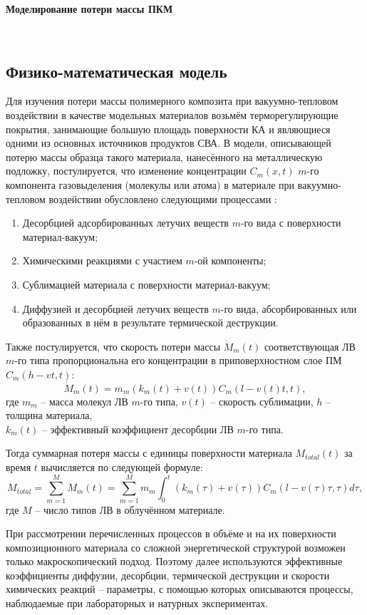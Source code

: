 \documentclass[
11pt,
master, %
subf, %
href, %
colorlinks=true, %
]{disser}
\newcommand*{\SR}[1]{\left( #1 \right)}
\begin{document}
\newpage
\begin{center}
	\textbf{\Large Моделирование потери массы ПКМ}
\end{center}


~

\subsection{Физико-математическая модель}
Для изучения потери массы полимерного композита при вакуумно-тепловом воздействии в качестве модельных материалов возьмём терморегулирующие покрытия, занимающие большую площадь поверхности КА и являющиеся одними из основных источников продуктов СВА. В модели, описывающей потерю массы образца такого материала, нанесённого на металлическую подложку, постулируется, что изменение концентрации $C_m(x,t)$ $m$-го компонента газовыделения (молекулы или атома) в материале при вакуумно-тепловом воздействии обусловлено следующими процессами \cite{Khas06, Khas06i}:
\begin{enumerate}
	\item Десорбцией адсорбированных летучих веществ $m$-го вида с поверхности материал-вакуум;
	\item Химическими реакциями с участием $m$-ой компоненты;
	\item Сублимацией материала с поверхности материал-вакуум;
	\item Диффузией и десорбцией летучих веществ $m$-го вида, абсорбированных или образованных в нём в результате термической деструкции.
\end{enumerate}
Также постулируется, что скорость потери массы $\dot{M}_m(t)$ соответствующая ЛВ $m$-го типа пропорциональна его концентрации в приповерхностном слое ПМ $C_m(h-vt, t)$:
$$\dot{M}_m(t) = m_m \SR{k_m(t) + v(t)} C_m(l-v(t) t,t),$$
где $m_m$ -- масса молекул ЛВ $m$-го типа, $v(t)$ -- скорость сублимации, $h$ -- толщина материала,\\
 $k_m(t)$ -- эффективный коэффициент десорбции ЛВ $m$-го типа.

Тогда суммарная потеря массы с единицы поверхности материала $M_{total}(t)$ за время $t$ вычисляется по следующей формуле:
$$M_{total} = \sum_{m=1}^{M} M_m(t) = \sum_{m=1}^{M}m_m \int_{0}^{t} \SR{k_m(\tau) + v(\tau)} C_m(l-v(\tau) \tau,\tau) d\tau,$$
где $M$ -- число типов ЛВ в облучённом материале.

При рассмотрении перечисленных процессов в объёме и на их поверхности композиционного материала со сложной энергетической структурой возможен только макроскопический подход. Поэтому далее используются эффективные коэффициенты диффузии, десорбции, термической деструкции и скорости химических реакций -- параметры, с помощью которых описываются процессы, наблюдаемые при лабораторных и натурных экспериментах.
\end{document}
